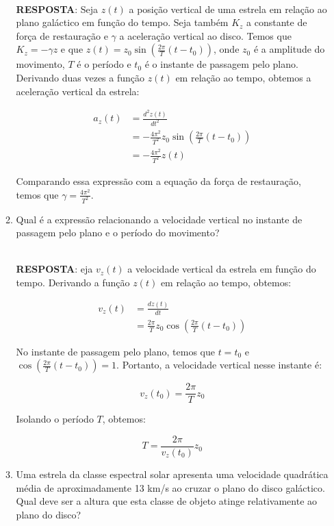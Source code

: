 \documentclass[a4paper,12pt]{article}
\begin{document}
\begin{enumerate}
\begin{enumerate}
\noindent\hrulefill\\\textbf{RESPOSTA}: Seja $z(t)$ a posição vertical de uma estrela em relação ao plano galáctico em função do tempo. Seja também $K_z$ a constante de força de restauração e $\gamma$ a aceleração vertical ao disco. Temos que $K_z = -\gamma z$ e que $z(t) = z_0 \sin \left( \frac{2\pi}{T} (t - t_0) \right)$, onde $z_0$ é a amplitude do movimento, $T$ é o período e $t_0$ é o instante de passagem pelo plano. Derivando duas vezes a função $z(t)$ em relação ao tempo, obtemos a aceleração vertical da estrela:

\begin{align*}
a_z(t) &= \frac{d^2 z(t)}{dt^2} \\
&= -\frac{4\pi^2}{T^2} z_0 \sin \left( \frac{2\pi}{T} (t - t_0) \right) \\
&= -\frac{4\pi^2}{T^2} z(t)
\end{align*}

Comparando essa expressão com a equação da força de restauração, temos que $\gamma = \frac{4\pi^2}{T^2}$.

\noindent\hrulefill

\item Qual é a expressão relacionando a velocidade vertical no instante de passagem pelo plano e o período do movimento?

\noindent\hrulefill\\\textbf{RESPOSTA}: eja $v_z(t)$ a velocidade vertical da estrela em função do tempo. Derivando a função $z(t)$ em relação ao tempo, obtemos:

\begin{align*}
v_z(t) &= \frac{dz(t)}{dt} \\
&= \frac{2\pi}{T} z_0 \cos \left( \frac{2\pi}{T} (t - t_0) \right)
\end{align*}

No instante de passagem pelo plano, temos que $t = t_0$ e $\cos \left( \frac{2\pi}{T} (t - t_0) \right) = 1$. Portanto, a velocidade vertical nesse instante é:

$$
v_z(t_0) = \frac{2\pi}{T} z_0
$$

Isolando o período $T$, obtemos:

$$
T = \frac{2\pi}{v_z(t_0)} z_0
$$

\noindent\hrulefill

\item Uma estrela da classe espectral solar apresenta uma velocidade quadrática média de aproximadamente 13 km/s ao cruzar o plano do disco galáctico. Qual deve ser a altura que esta classe de objeto atinge relativamente ao plano do disco?


\end{enumerate}
\end{enumerate}
\end{document}
